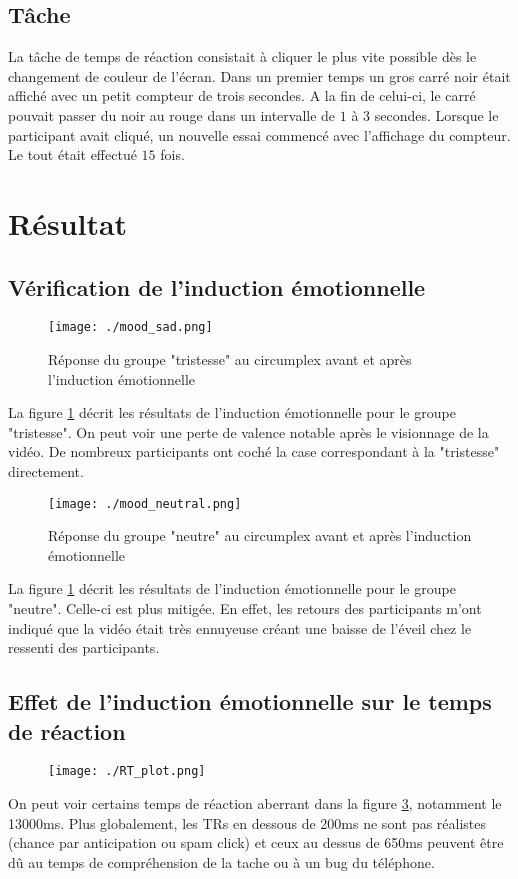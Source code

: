 \documentclass{article}
\begin{document}
\subsection{Tâche}
La tâche de temps de réaction consistait à cliquer le plus vite possible dès le changement de couleur de l'écran. Dans un premier temps un gros carré noir était affiché avec un petit compteur de trois secondes. A la fin de celui-ci, le carré pouvait passer du noir au rouge dans un intervalle de $ 1 $ à $ 3 $ secondes. Lorsque le participant avait cliqué, un nouvelle essai commencé avec l'affichage du compteur. Le tout était effectué $ 15 $ fois. 

\section{Résultat}
\subsection{Vérification de l'induction émotionnelle}
\begin{figure}[htbp]
    \centering
    \texttt{[image: ./mood\_sad.png]}
    \caption{Réponse du groupe "tristesse" au circumplex avant et après l'induction émotionnelle}
    \label{mood_sad}
\end{figure}
La figure \ref{mood_sad} décrit les résultats de l'induction émotionnelle pour le groupe "tristesse". On peut voir une perte de valence notable après le visionnage de la vidéo. De nombreux participants ont coché la case correspondant à la "tristesse" directement.

\begin{figure}[htbp]
    \centering
    \texttt{[image: ./mood\_neutral.png]}
    \caption{Réponse du groupe "neutre" au circumplex avant et après l'induction émotionnelle}
    \label{mood_neutral}
\end{figure}
La figure \ref{mood_sad} décrit les résultats de l'induction émotionnelle pour le groupe "neutre". Celle-ci est plus mitigée. En effet, les retours des participants m'ont indiqué que la vidéo était très ennuyeuse créant une baisse de l'éveil chez le ressenti des participants.

\subsection{Effet de l'induction émotionnelle sur le temps de réaction}
\begin{figure}[htbp]
    \centering
    \texttt{[image: ./RT\_plot.png]}
    \label{RT_plot}
\end{figure}
On peut voir certains temps de réaction aberrant dans la figure \ref{RT_plot}, notamment le 13000ms. Plus globalement, les TRs en dessous de 200ms ne sont pas réalistes (chance par anticipation ou spam click) et ceux au dessus de 650ms peuvent être dû au temps de compréhension de la tache ou à un bug du téléphone.
\end{document}
